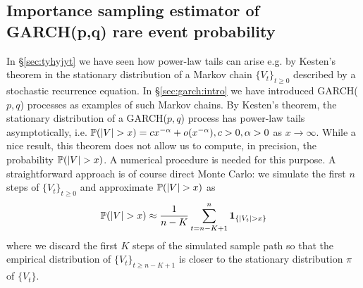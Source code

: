 \subsection{Importance sampling estimator of GARCH(p,q) rare event
  probability}
In \S\ref{sec:tyhyjyt} we have seen how power-law tails can
arise e.g. by Kesten's theorem in the stationary distribution of a
Markov chain $\{V_t\}_{t \geq 0}$ described by a stochastic recurrence
equation. In \S\ref{sec:garch:intro} we have introduced GARCH($p,q$)
processes as examples of such Markov chains. By Kesten's theorem, the
stationary distribution of a GARCH($p,q$) process has power-law tails
asymptotically, i.e.
$\P(|V| > x) = c x^{-\alpha} + o(x^{-\alpha}), c > 0, \alpha > 0$ as
$x \to \infty$. While a nice result, this theorem does not allow us to
compute, in precision, the probability $\P(|V| > x)$. A numerical
procedure is needed for this purpose. A straightforward approach is of
course direct Monte Carlo: we simulate the first $n$ steps of
$\{V_t\}_{t \geq 0}$ and approximate $\P(|V| > x)$ as
\begin{equation}
  \label{eq:trhythyth}
  \P(|V| > x) \approx {1 \over n - K} \sum_{t={n-K+1}}^n\1{|V_t| > x}
\end{equation}
where we discard the first $K$ steps of the simulated sample path so
that the empirical distribution of $\{V_t\}_{t \geq n-K+1}$ is closer
to the stationary distribution $\pi$ of $\{V_t\}$.

